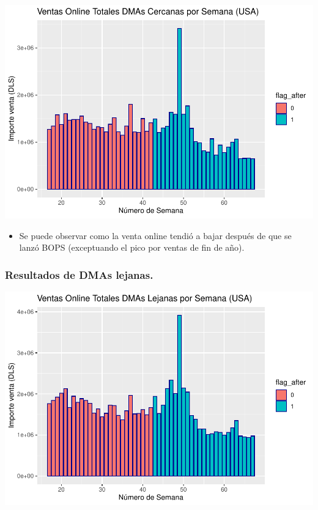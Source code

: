 \documentclass[
  landscape]{article}
\providecommand{\tightlist}{%
  \setlength{\itemsep}{0pt}\setlength{\parskip}{0pt}}
\begin{document}
\includegraphics{R_BOPS_files/figure-latex/exportando_datos_DMAs_Cerca-1.pdf}

\begin{itemize}
\tightlist
\item
  Se puede observar como la venta online tendió a bajar después de que
  se lanzó BOPS (exceptuando el pico por ventas de fin de año).
\end{itemize}

\hypertarget{resultados-de-dmas-lejanas.}{%
\subsubsection{Resultados de DMAs
lejanas.}\label{resultados-de-dmas-lejanas.}}

\includegraphics{R_BOPS_files/figure-latex/DMAs_Lejanas-1.pdf}
\end{document}
